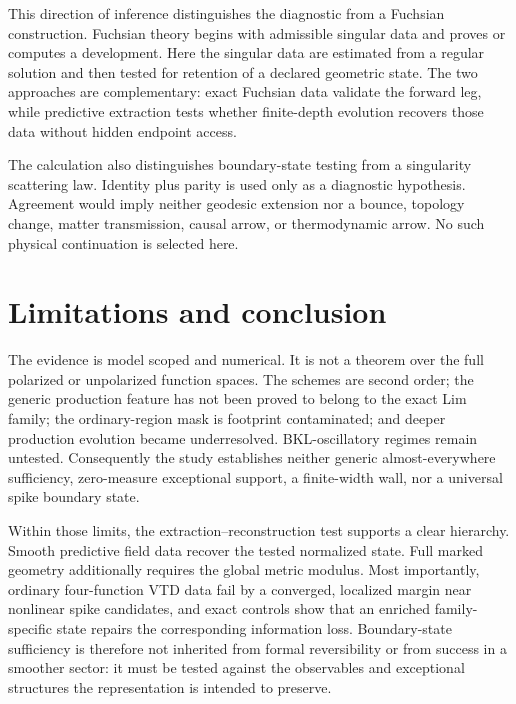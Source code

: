 \documentclass{iopjournal}
\begin{document}
This direction of inference distinguishes the diagnostic from a Fuchsian construction. Fuchsian theory begins with admissible singular data and proves or computes a development. Here the singular data are estimated from a regular solution and then tested for retention of a declared geometric state. The two approaches are complementary: exact Fuchsian data validate the forward leg, while predictive extraction tests whether finite-depth evolution recovers those data without hidden endpoint access.

The calculation also distinguishes boundary-state testing from a singularity scattering law. Identity plus parity is used only as a diagnostic hypothesis. Agreement would imply neither geodesic extension nor a bounce, topology change, matter transmission, causal arrow, or thermodynamic arrow. No such physical continuation is selected here.

\section{Limitations and conclusion}
The evidence is model scoped and numerical. It is not a theorem over the full polarized or unpolarized function spaces. The schemes are second order; the generic production feature has not been proved to belong to the exact Lim family; the ordinary-region mask is footprint contaminated; and deeper production evolution became underresolved. BKL-oscillatory regimes remain untested. Consequently the study establishes neither generic almost-everywhere sufficiency, zero-measure exceptional support, a finite-width wall, nor a universal spike boundary state.

Within those limits, the extraction--reconstruction test supports a clear hierarchy. Smooth predictive field data recover the tested normalized state. Full marked geometry additionally requires the global metric modulus. Most importantly, ordinary four-function VTD data fail by a converged, localized margin near nonlinear spike candidates, and exact controls show that an enriched family-specific state repairs the corresponding information loss. Boundary-state sufficiency is therefore not inherited from formal reversibility or from success in a smoother sector: it must be tested against the observables and exceptional structures the representation is intended to preserve.

\appendix
\end{document}

